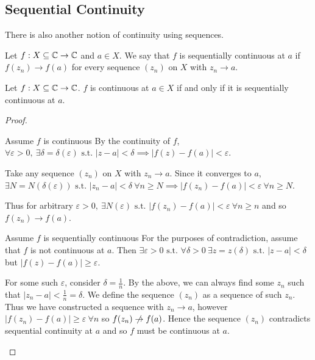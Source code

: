 \documentclass[../main.tex]{subfiles}
\begin{document}
\subsection{Sequential Continuity}
There is also another notion of continuity using sequences.
\begin{definition}
  Let $f: X \subseteq \mathbb{C} \to \mathbb{C}$ and $a \in X$.
  We say that $f$ is sequentially continuous at $a$ if $f(z_n) \to f(a)$ for every sequence $(z_n)$ on $X$ with $z_n \to a$.
  \label{sequentialContinuity}
\end{definition}
\begin{proposition}
  Let $f: X \subseteq \mathbb{C} \to \mathbb{C}$.
  $f$ is continuous at $a \in X$ if and only if it is sequentially continuous at $a$.
  \label{sequentialContinuityEquivalence}
\end{proposition}
\begin{proof}
  \begin{proofdirection}{Assume $f$ is continuous}
    By the continuity of $f$, $\forall \varepsilon > 0,\ \exists \delta = \delta(\varepsilon) \text{ s.t. } |z - a| < \delta \implies |f(z) - f(a)| < \varepsilon$.

    Take any sequence $(z_n)$ on $X$ with $z_n \to a$.
    Since it converges to $a$, $\exists N = N(\delta(\varepsilon)) \text{ s.t. } |z_n - a| < \delta\ \forall n \geq N \implies |f(z_n) - f(a)| < \varepsilon\ \forall n \geq N$.

    Thus for arbitrary $\varepsilon > 0,\ \exists N(\varepsilon) \text{ s.t. } |f(z_n) - f(a)| < \varepsilon \ \forall n \geq n$ and so $f(z_n) \to f(a)$.
  \end{proofdirection}
  \begin{proofdirection}{Assume $f$ is sequentially continuous}
    For the purposes of contradiction, assume that $f$ is not continuous at $a$.
    Then $\exists \varepsilon > 0 \text{ s.t. } \forall \delta > 0\ \exists z = z(\delta) \text{ s.t. } |z - a| < \delta$ but $|f(z) - f(a)| \geq \varepsilon$.

    For some such $\varepsilon$, consider $\delta = \frac{1}{n}$.
    By the above, we can always find some $z_n$ such that $|z_n - a| < \frac{1}{n} = \delta$.
    We define the sequence $(z_n)$ as a sequence of such $z_n$.
    Thus we have constructed a sequence with $z_n \to a$, however $|f(z_n) - f(a)| \geq \varepsilon\ \forall n$ so $f(z_n) \centernot\to f(a)$.
    Hence the sequence $(z_n)$ contradicts sequential continuity at $a$ and so $f$ must be continuous at $a$.
  \end{proofdirection}
\end{proof}
\end{document}
